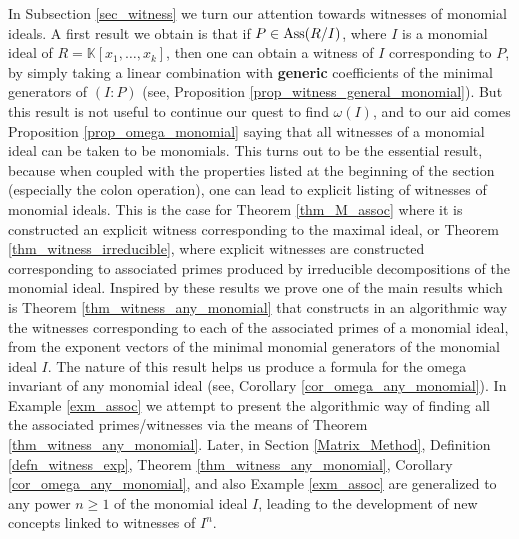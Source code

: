 \documentclass[11pt]{amsart}   %
\begin{document}
In Subsection \ref{sec_witness} we turn our attention towards witnesses of monomial ideals. A first result we obtain is that if $P\in{\rm Ass}(R/I)$, where $I$ is a monomial ideal of $R=\mathbb K[x_1,\ldots,x_k]$, then one can obtain a witness of $I$ corresponding to $P$, by simply taking a linear combination with {\bf generic} coefficients of the minimal generators of $(I:P)$ (see, Proposition \ref{prop_witness_general_monomial}). But this result is not useful to continue our quest to find $\omega(I)$, and to our aid comes Proposition \ref{prop_omega_monomial} saying that all witnesses of a monomial ideal can be taken to be monomials. This turns out to be the essential result, because when coupled with the properties listed at the beginning of the section (especially the colon operation), one can lead to explicit listing of witnesses of monomial ideals. This is the case for Theorem \ref{thm_M_assoc} where it is constructed an explicit witness corresponding to the maximal ideal, or Theorem \ref{thm_witness_irreducible}, where explicit witnesses are constructed corresponding to associated primes produced by irreducible decompositions of the monomial ideal. Inspired by these results we prove one of the main results which is Theorem \ref{thm_witness_any_monomial} that constructs in an algorithmic way the witnesses corresponding to each of the associated primes of a monomial ideal, from the exponent vectors of the minimal monomial generators of the monomial ideal $I$. The nature of this result helps us produce a formula for the omega invariant of any monomial ideal (see, Corollary \ref{cor_omega_any_monomial}). In Example \ref{exm_assoc} we attempt to present the algorithmic way of finding all the associated primes/witnesses via the means of Theorem \ref{thm_witness_any_monomial}. Later, in Section \ref{Matrix_Method}, Definition \ref{defn_witness_exp}, Theorem \ref{thm_witness_any_monomial}, Corollary \ref{cor_omega_any_monomial}, and also Example \ref{exm_assoc} are generalized to any power $n\geq 1$ of the monomial ideal $I$, leading to the development of new concepts linked to witnesses of $I^n$.
\end{document}
